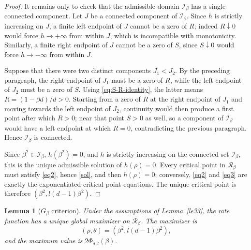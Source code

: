 \documentclass[11pt]{amsart}
\theoremstyle{plain}
\newtheorem{lemma}[theorem]{Lemma}
\numberwithin{equation}{section}
\numberwithin{theorem}{section}
\numberwithin{figure}{section}
\begin{document}
\begin{proof}
It remains only to check that the admissible domain $\mathcal I_\beta$ has a single
connected component.  Let $J$ be a connected component of $\mathcal I_\beta$.  Since $h$
is strictly increasing on $J$, a finite left endpoint of $J$ cannot be a zero of $R$; indeed
$R\downarrow0$ would force $h\to+\infty$ from within $J$, which is incompatible with
monotonicity.  Similarly, a finite right endpoint of $J$ cannot be a zero of $S$, since
$S\downarrow0$ would force $h\to-\infty$ from within $J$.

Suppose that there were two distinct components $J_1<J_2$.  By the preceding paragraph,
the right endpoint of $J_1$ must be a zero of $R$, while the left endpoint of $J_2$ must be
a zero of $S$.  Using \eqref{eq:S-R-identity}, the latter means
$R=(1-\beta d)/d>0$.  Starting from a zero of $R$ at the right endpoint of $J_1$ and moving
towards the left endpoint of $J_2$, continuity would then produce a first point after which
$R>0$; near that point $S>0$ as well, so a component of $\mathcal I_\beta$ would have a
left endpoint at which $R=0$, contradicting the previous paragraph.  Hence
$\mathcal I_\beta$ is connected.

Since $\beta^2\in\mathcal I_\beta$, $h(\beta^2)=0$, and $h$ is strictly increasing on the
connected set $\mathcal I_\beta$, this is the unique admissible solution of $h(\rho)=0$.
Every critical point in $\mathcal R_\beta$ must satisfy \eqref{eq2}, hence \eqref{sol}, and
then $h(\rho)=0$; conversely, \eqref{eq2} and \eqref{eq3} are exactly the exponentiated
critical point equations.  The unique critical point is therefore
$(\beta^2,l(d-1)\beta^2)$.
\end{proof}

\begin{lemma}[$G_\beta$ criterion]\label{le34}
Under the assumptions of Lemma~\ref{le33}, the rate function has a unique
global maximizer on $\overline{\mathcal R_\beta}$.  The maximizer is
\[
(\rho,\theta)=(\beta^2,l(d-1)\beta^2),
\]
and the maximum value is $2\Phi_{d,l}(\beta)$.
\end{lemma}
\end{document}
